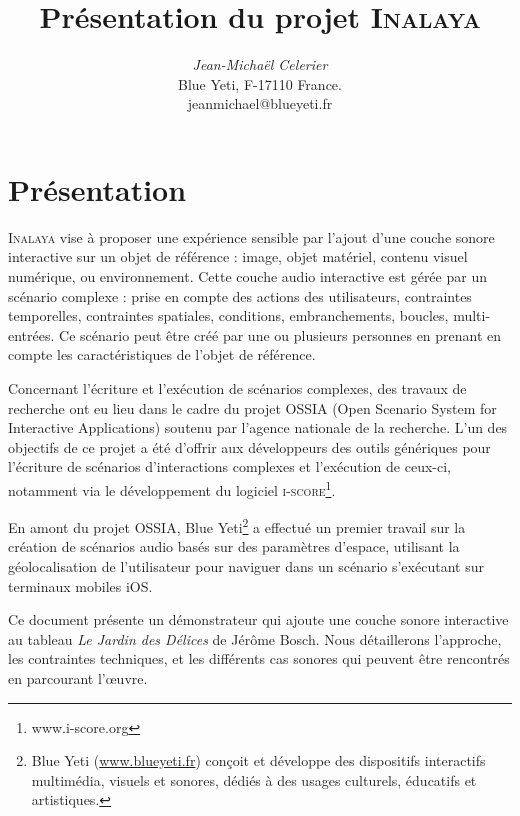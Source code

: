 \documentclass{article}
\title{Présentation du projet \textsc{Inalaya}}
\author{\emph{Jean-Michaël Celerier} \\  Blue Yeti, F-17110 France. \\ jeanmichael@blueyeti.fr }
\date{}
\begin{document}
    \maketitle
    \section*{Présentation}
    \textsc{Inalaya} vise à proposer une expérience sensible par l’ajout d’une couche sonore interactive sur 
    un objet de référence : image, objet matériel, contenu visuel numérique, ou environnement.
    Cette couche audio interactive est gérée par un scénario complexe : prise en compte 
    des  actions des utilisateurs, contraintes temporelles, contraintes spatiales, conditions, 
    embranchements, boucles, multi-entrées. 
    Ce scénario peut être créé par une ou plusieurs personnes en prenant en compte les caractéristiques de l’objet de référence.
    
    Concernant l’écriture et l’exécution de scénarios complexes, des travaux de recherche ont eu lieu 
    dans le cadre du projet \textsc{OSSIA} (Open Scenario System for Interactive Applications) soutenu 
    par l’agence nationale de la recherche.
    L’un des objectifs de ce projet a été d’offrir aux développeurs des outils génériques pour l’écriture de scénarios d’interactions complexes et l’exécution de ceux-ci, notamment via le développement du logiciel \textsc{i-score}\footnote{www.i-score.org}.
    
    En amont du projet OSSIA, Blue Yeti\footnote{Blue Yeti (\url{www.blueyeti.fr}) conçoit et développe des dispositifs interactifs multimédia, visuels et sonores, dédiés à des usages culturels, éducatifs et artistiques.} a effectué un premier travail sur la création de scénarios 
    audio basés sur des paramètres d’espace, utilisant la géolocalisation de l’utilisateur pour 
    naviguer dans un scénario s’exécutant sur terminaux mobiles iOS.
    
    Ce document présente un démonstrateur qui ajoute une couche sonore interactive au tableau \emph{Le Jardin des Délices} de Jérôme Bosch.
    Nous détaillerons l'approche, les contraintes techniques, et les différents cas sonores qui peuvent être rencontrés en parcourant l'\oe uvre.
\end{document}
